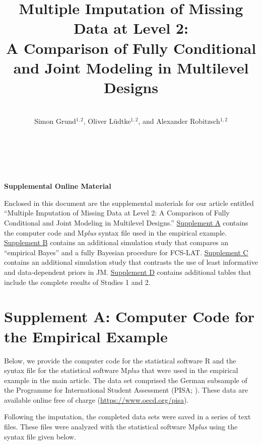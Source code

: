 \documentclass[doc,12pt]{apa6}
\title{Multiple Imputation of Missing Data at Level 2:\\ A Comparison of Fully Conditional and Joint Modeling in Multilevel Designs}
\author{\\[1ex]Simon Grund$^{1,2}$, Oliver L\"udtke$^{1,2}$, and Alexander Robitzsch$^{1,2}$}
\affiliation{\\[3ex]$^1$Leibniz Institute for Science and Mathematics Education, Kiel, Germany\\[1ex]
$^2$Centre for International Student Assessment, Germany}
\begin{document}
~\\[4ex]\doublespace{ \maketitle }

\begin{center}\begin{Large}~\\[8ex]
\bf{Supplemental Online Material}
\end{Large}\end{center}

\newpage 
\setcounter{page}{1}

\noindent
Enclosed in this document are the supplemental materials for our article entitled ``Multiple Imputation of Missing Data at Level 2: A Comparison of Fully Conditional and Joint Modeling in Multilevel Designs.''
\hyperref[sec:supc]{Supplement A} contains the computer code and M\emph{plus} syntax file used in the empirical example.
\hyperref[sec:supb]{Supplement B} contains an additional simulation study that compares an ``empirical Bayes'' and a fully Bayesian procedure for FCS-LAT.
\hyperref[sec:supa]{Supplement C} contains an additional simulation study that contrasts the use of least informative and data-dependent priors in JM.
\hyperref[sec:supd]{Supplement D} contains additional tables that include the complete results of Studies 1 and 2.

\section{Supplement A: Computer Code for the Empirical Example}
\label{sec:supa}

Below, we provide the computer code for the statistical software R \citep{RCoreTeam2016} and the syntax file for the statistical software M\emph{plus} that were used in the empirical example in the main article.
The data set comprised the German subsample of the Programme for International Student Assessment (PISA; \citealp{OECD2014}). These data are available online free of charge (\url{https://www.oecd.org/pisa}).


\noindent
Following the imputation, the completed data sets were saved in a series of text files.
These files were analyzed with the statistical software M\emph{plus} \citep{Muthen2012} using the syntax file given below.
\end{document}
